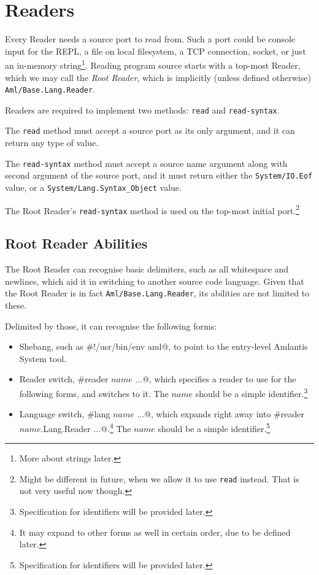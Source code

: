 \section{Readers}
\label{sec:environment-language-readers}

Every Reader needs a source port to read from. Such a port could be console input for the REPL, a file on local filesystem, a TCP connection, socket, or just an in-memory string\footnote{More about strings later.}. Reading program source starts with a top-most Reader, which we may call the {\em Root Reader}, which is implicitly (unless defined otherwise) \lstinline!Aml/Base.Lang.Reader!.

Readers are required to implement two methods: \lstinline!read! and \lstinline!read-syntax!. 

The \lstinline!read! method must accept a source port as its only argument, and it can return any type of value.

The \lstinline!read-syntax! method must accept a source name argument along with second argument of the source port, and it must return either the \lstinline!System/IO.Eof! value, or a \lstinline!System/Lang.Syntax_Object! value.

The Root Reader's \lstinline!read-syntax! method is used on the top-most initial port.\footnote{Might be different in future, when we allow it to use \lstinline!read! instead. That is not very useful now though.}






\subsection{Root Reader Abilities}
\label{subsec:environment-language-root-reader}

The Root Reader can recognise basic delimiters, such as all whitespace and newlines, which aid it in switching to another source code language. Given that the Root Reader is in fact \lstinline!Aml/Base.Lang.Reader!, its abilities are not limited to these.

Delimited by those, it can recognise the following forms:

\begin{itemize}
  \item Shebang, such as \lstinline@#!/usr/bin/env aml@, to point to the entry-level Amlantis System tool.
  \item Reader switch, \lstinline@#reader $name$ $\ldots$@, which specifies a reader to use for the following forms, and switches to it. The $name$ should be a simple identifier.\footnote{Specification for identifiers will be provided later.}
  \item Language switch, \lstinline@#lang $name$ $\ldots$@, which expands right away into \lstinline@#reader $name$.Lang.Reader $\ldots$@.\footnote{It may expand to other forms as well in certain order, due to be defined later.} The $name$ should be a simple identifier.\footnote{Specification for identifiers will be provided later.}
\end{itemize}

